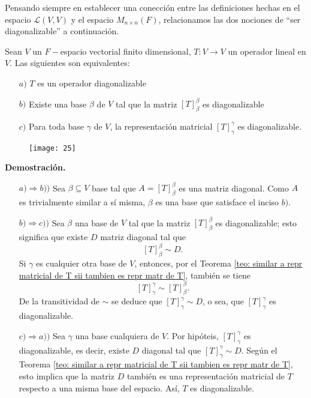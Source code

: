 Pensando siempre en establecer una conección entre
las definiciones hechas en el espacio
$\mathcal{L}(V, V)$ y el espacio $M_{n \times n}(F)$,
relacionamos las dos nociones de ``ser diagonalizable'' a continuación.
\begin{prop}
Sean $V$ un $F-$espacio vectorial finito dimensional, $T: V \longrightarrow V$
un operador lineal en $V$. Las siguientes son equivalentes:
\begin{itemize}
	\item[$a)$] $T$ es un operador diagonalizable
	\item[$b)$] Existe una base $\beta$ de $V$ tal que la matriz
	$[T]_{\beta}^{\beta}$ es diagonalizable 
	\item[$c)$] Para toda base $\gamma$ de $V$, la representación
	matricial $[T]_{\gamma}^{\gamma}$ es diagonalizable.
\end{itemize}
\end{prop}

\begin{figure}[H]
\centering
	\texttt{[image: 25]}
 \end{figure}
\noindent
\textbf{Demostración.}
\begin{itemize}
	\item[$a) \Rightarrow b) )$] Sea $\beta \subseteq V$ base tal que 
	$A = [T]_{\beta}^{\beta}$ es una matriz diagonal. Como 
	$A$ es trivialmente similar a sí misma, $\beta$ es una base que
	satisface el inciso $b)$.
	\item[$b) \Rightarrow c) )$] Sea $\beta$ una base de $V$ tal que
	la matriz $[T]_{\beta}^{\beta}$ es diagonalizable; esto significa
	que existe $D$ matriz diagonal tal que
	\[
	[T]_{\beta}^{\beta} \sim D.
	\]
	Si $\gamma$ es cualquier otra base de $V$, entonces, por el Teorema
	\ref{teo: similar a repr matricial de T sii tambien es repr matr de T},
	también se tiene
	\[
	[T]_{\gamma}^{\gamma} \sim [T]_{\beta}^{\beta}.
	\]
	De la transitividad de $\sim$ se deduce que 
	$[T]_{\gamma}^{\gamma} \sim D$, o sea, que $[T]_{\gamma}^{\gamma}$
	es diagonalizable.
	\item[$c) \Rightarrow a) )$] Sea $\gamma$ una base cualquiera de $V$.
	Por hipóteis, $[T]_{\gamma}^{\gamma}$ es diagonalizable, es decir,
	existe $D$ diagonal tal que $[T]_{\gamma}^{\gamma} \sim D$. Según
	el Teorema 
	\ref{teo: similar a repr matricial de T sii tambien es repr matr de T},
	esto implica que la matriz $D$ también es una representación matricial
	de $T$ respecto a una misma base del espacio. 
	Así, $T$ es diagonalizable.
\end{itemize}
\QEDB
\vspace{0.2cm}

